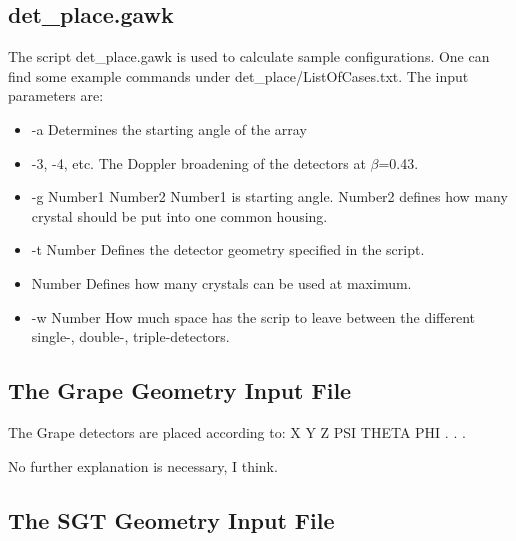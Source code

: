 \documentclass[12pt]{book}
\begin{document}
\subsection {{\ttfamily det\_place.gawk}}
The script {\ttfamily det\_place.gawk} is used to calculate sample configurations.
One can find some example commands under {\ttfamily det\_place/ListOfCases.txt}.
The input parameters are:
\begin{itemize}
\item -a \hfill{} \linebreak
  Determines the starting angle of the array
\item -3, -4, etc.\hfill{} \linebreak
  The Doppler broadening of the detectors at $\beta$=0.43.
\item -g Number1 Number2\hfill{} \linebreak
  Number1 is starting angle. Number2 defines how many crystal should be put into one common housing.
\item -t Number\hfill{} \linebreak
Defines the detector geometry specified in the script.
\item Number\hfill{} \linebreak
  Defines how many crystals can be used at maximum.
\item -w Number\hfill{} \linebreak
  How much space has the scrip to leave between the different single-, double-, triple-detectors.
\end{itemize}


\subsection{The Grape Geometry Input File}

The Grape detectors are placed according to:\hfill{}
\linebreak
\linebreak
{\ttfamily X Y Z PSI THETA PHI}\linebreak
{\ttfamily .}\linebreak
{\ttfamily .}\linebreak
{\ttfamily .}\linebreak
\linebreak
\linebreak

No further explanation is necessary, I think.

\subsection{The SGT Geometry Input File}
\end{document}
